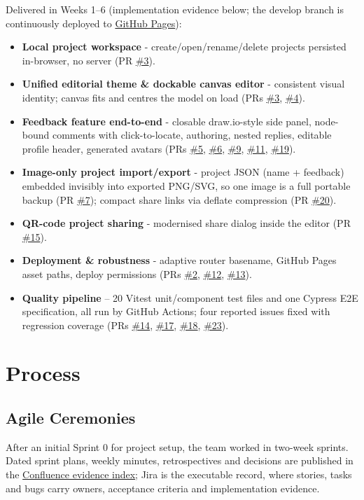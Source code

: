 \documentclass[10pt,a4paper]{article}
\newcommand{\ghbase}{https://github.com/lkevincc0/mm-local-editor}
\newcommand{\PR}[1]{\href{\ghbase/pull/#1}{\##1}}
\newcommand{\wikibase}{https://student-team-zvzgb5e3.atlassian.net/wiki/spaces/~7120206e0163ea5d37428b992775145124d7e8/pages/}
\newcommand{\wpage}[2]{\href{\wikibase#1}{#2}}
\begin{document}
Delivered in Weeks 1--6 (implementation evidence below; the develop branch is continuously deployed to \href{https://lkevincc0.github.io/mm-local-editor/}{GitHub Pages}):
\begin{itemize}
  \item \textbf{Local project workspace} - create/open/rename/delete projects persisted in-browser, no server (PR \PR{3}).
  \item \textbf{Unified editorial theme \& dockable canvas editor} - consistent visual identity; canvas fits and centres the model on load (PRs \PR{3}, \PR{4}).
  \item \textbf{Feedback feature end-to-end} - closable draw.io-style side panel, node-bound comments with click-to-locate, authoring, nested replies, editable profile header, generated avatars (PRs \PR{5}, \PR{6}, \PR{9}, \PR{11}, \PR{19}).
  \item \textbf{Image-only project import/export} - project JSON (name + feedback) embedded invisibly into exported PNG/SVG, so one image is a full portable backup (PR \PR{7}); compact share links via deflate compression (PR \PR{20}).
  \item \textbf{QR-code project sharing} - modernised share dialog inside the editor (PR \PR{15}).
  \item \textbf{Deployment \& robustness} - adaptive router basename, GitHub Pages asset paths, deploy permissions (PRs \PR{2}, \PR{12}, \PR{13}).
  \item \textbf{Quality pipeline} -- 20 Vitest unit/component test files and one Cypress E2E specification, all run by GitHub Actions; four reported issues fixed with regression coverage (PRs \PR{14}, \PR{17}, \PR{18}, \PR{23}).
\end{itemize}

\section{Process}

\subsection{Agile Ceremonies}
After an initial Sprint 0 for project setup, the team worked in two-week sprints. Dated sprint plans, weekly minutes, retrospectives and decisions are published in the \wpage{458754}{Confluence evidence index}; Jira is the executable record, where stories, tasks and bugs carry owners, acceptance criteria and implementation evidence.
\end{document}
